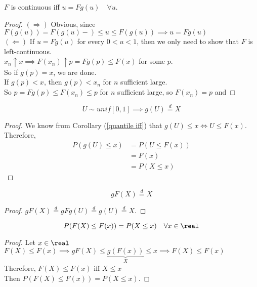 \documentclass[11pt]{article}
\numberwithin{equation}{section}
\begin{document}
\corollary \label{u=Fg(u)}$F$ is continuous iff $u = Fg(u) \quad \forall u$.
\begin{proof}
	$(\Rightarrow)$ Obvious, since $F(g(u)) = F(g(u)-) \leq u \leq F(g(u)) \implies u = Fg(u)$ \\
	$(\Leftarrow)$  If $u = Fg(u)$ for every $0 < u < 1$, then we only need to show that $F$ is left-continuous.\\
	$x_n \uparrow x \implies F(x_n) \uparrow p = Fg(p) \leq F(x)$ for some $p$.\\
	So if $g(p) = x$, we are done. \\
	If $g(p) < x$, then $g(p) < x_n$ for $n$ sufficient large.\\
	So $p = Fg(p) \leq F(x_n) \leq p$ for $n$ sufficient large, so $F(x_n) = p$ and 
\end{proof}

 \label{the quantile transform}
\begin{equation}
	U \sim unif[0, 1] \implies g(U) \overset{d}{=} X
\end{equation}
\begin{proof}
	We know from Corollary (\ref{quantile iff}) that $g(U) \leq x \iff U \leq F(x)$.\\
	Therefore,
	\begin{align*}
		P(g(U) \leq x) &= P(U \leq F(x)) \\
		&= F(x) \tag{by the property of uniform distribution}\\
		&= P(X\leq x)
	\end{align*}
\end{proof}

\corollary 
\begin{equation}
	gF(X) \overset{d}{=} X
\end{equation}
\begin{proof}
	$gF(X) \overset{d}{=} gFg(U) \overset{d}{=} g(U) \overset{d}{=} X$.
\end{proof}

\corollary
\begin{equation}
	P(F(X) \leq F(x)) = P(X \leq x) \quad \forall x \in \real
\end{equation}

\begin{proof}
	Let $x \in \real$\\
	$F(X) \leq F(x) \implies gF(X) \leq \underbrace{g(F(x))}_{X} \leq x \implies F(X) \leq F(x)$ \\
	Therefore, $F(X) \leq F(x)$ iff $X \leq x$\\
	Then $P(F(X) \leq F(x)) = P(X \leq x)$.
\end{proof}
\end{document}
